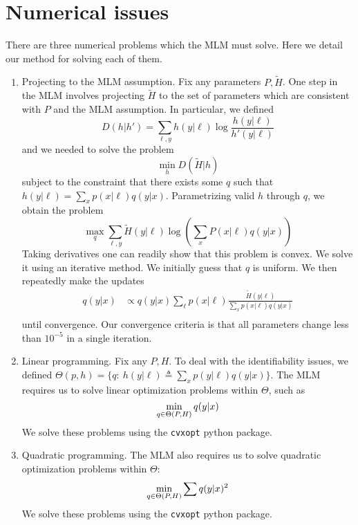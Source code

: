 


\appendix


%
 

\section{Numerical issues}

\label{sec:optproblems}

There are three numerical problems which the MLM must solve.  Here we detail our method for solving each of them.

\begin{enumerate}

    \item Projecting to the MLM assumption.  Fix any parameters $P,\tilde H$.  One step in the MLM involves projecting $\tilde H$ to the set of parameters which are consistent with $P$ and the MLM assumption.  In particular, we defined
    \[
    D(h|h') = \sum_{\ell,y} h(y|\ell) \log \frac{h(y|\ell)}{h'(y|\ell)}
    \]
    and we needed to solve the problem
    \[
    \min_{h} D(\tilde H|h)
    \]
    subject to the constraint that there exists some $q$ such that $h(y|\ell)=\sum_x p(x|\ell)q(y|x)$.  Parametrizing valid $h$ through $q$, we obtain the problem
    \[
    \max_{q} \sum_{\ell,y} \tilde H(y|\ell) \log \left(\sum_x P(x|\ell) q(y|x)\right)
    \]
    Taking derivatives one can readily show that this problem is convex.  We solve it using an iterative method.  We initially guess that $q$ is uniform.  We then repeatedly make the updates
    \begin{align*}
    q(y|x)  &\propto q(y|x)\sum_{\ell}p(x|\ell)\frac{\tilde H(y|\ell)}{\sum_x p(x|\ell)q(y|x)}\\
    \end{align*}
    until convergence.  Our convergence criteria is that all parameters change less than $10^{-5}$ in a single iteration.

    \item Linear programming.  Fix any $P,H$.  To deal with the identifiability issues, we defined $\Theta(p,h)=\{q:\ h(y|\ell) \triangleq \sum_x p(y|\ell)q(y|x)\}$.  The MLM requires us to solve linear optimization problems within $\Theta$, such as 
    \[
    \min_{q\in \Theta(P,H)} q(y|x) \\
    \]
    We solve these problems using the {\tt cvxopt} python package.

    \item Quadratic programming.  The MLM also requires us to solve quadratic optimization problems within $\Theta$:
    \[
    \min_{q\in \Theta(P,H)} \sum q(y|x)^2 \\
    \]
    We solve these problems using the {\tt cvxopt} python package.


\end{enumerate}

